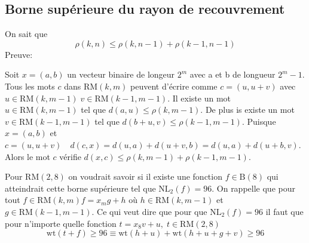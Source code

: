 \documentclass{article}
\def\RM#1#2{\ensuremath{\mathrm{RM}(#1, #2)}}
\def\WT#1{\ensuremath{\mathrm{wt}(#1)}}
\begin{document}
\subsection{Borne supérieure du rayon de recouvrement}
On sait que
$$ \rho(k, n) \leq \rho(k, n-1) + \rho(k - 1, n - 1) $$
Preuve:

Soit $x=(a, b)$ un vecteur binaire de longeur $2^m$ avec a et b de longueur $2^m-1$. Tous les mots $c$ dans \RM{k}{m} peuvent d'écrire comme $c = (u, u+v)$ avec $u \in \RM{k}{m-1} \; v \in \RM{k-1}{m-1}$. Il existe un mot $u \in \RM{k}{m-1}$ tel que $d(a, u) \leq \rho(k, m-1)$.
De plus is existe un mot $v \in \RM{k-1}{m-1}$ tel que $d(b+u, v) \leq \rho(k-1, m-1)$.
Puisque $x=(a,b)$ et $c = (u, u+v) \quad d(c, x) = d(u, a) + d(u+v, b) = d(u, a) + d(u+b, v)$.
Alors le mot $c$ vérifie $d(x, c) \leq \rho(k, m-1) + \rho(k-1, m-1)$.


Pour \RM{2}{8} on voudrait savoir si il existe une fonction $f \in \mathrm{B}(8)$ qui atteindrait cette borne supérieure tel que $\mathrm{NL}_2(f) = 96$.
On rappelle que pour tout $f \in \RM{k}{m} f = x_mg+h$ où $h \in \RM{k}{m-1}$ et $g \in \RM{k-1}{m-1}$.
Ce qui veut dire que pour que $\mathrm{NL}_2(f) = 96$ il faut que pour n'importe quelle fonction $t = x_8v + u, \; t \in \RM{2}{8}$
$$\mathrm{wt}(t+f) \geq 96 \equiv \WT{h+u}+\WT{h+u+g+v} \geq 96$$
\end{document}

